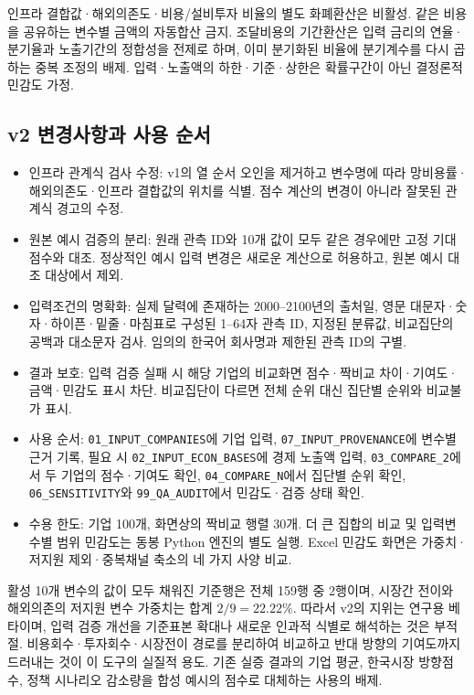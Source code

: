 인프라 결합값·해외의존도·비용/설비투자 비율의 별도 화폐환산은 비활성. 같은 비용을 공유하는 변수별 금액의 자동합산 금지. 조달비용의 기간환산은 입력 금리의 연율·분기율과 노출기간의 정합성을 전제로 하며, 이미 분기화된 비율에 분기계수를 다시 곱하는 중복 조정의 배제. 입력·노출액의 하한·기준·상한은 확률구간이 아닌 결정론적 민감도 가정.

\subsection*{v2 변경사항과 사용 순서}
\begin{itemize}[leftmargin=1.8em,itemsep=0.3em]
\item 인프라 관계식 검사 수정: v1의 열 순서 오인을 제거하고 변수명에 따라 망비용률·해외의존도·인프라 결합값의 위치를 식별. 점수 계산의 변경이 아니라 잘못된 관계식 경고의 수정.
\item 원본 예시 검증의 분리: 원래 관측 ID와 10개 값이 모두 같은 경우에만 고정 기대점수와 대조. 정상적인 예시 입력 변경은 새로운 계산으로 허용하고, 원본 예시 대조 대상에서 제외.
\item 입력조건의 명확화: 실제 달력에 존재하는 2000--2100년의 출처일, 영문 대문자·숫자·하이픈·밑줄·마침표로 구성된 1--64자 관측 ID, 지정된 분류값, 비교집단의 공백과 대소문자 검사. 임의의 한국어 회사명과 제한된 관측 ID의 구별.
\item 결과 보호: 입력 검증 실패 시 해당 기업의 비교화면 점수·짝비교 차이·기여도·금액·민감도 표시 차단. 비교집단이 다르면 전체 순위 대신 집단별 순위와 비교불가 표시.
\item 사용 순서: \nolinkurl{01_INPUT_COMPANIES}에 기업 입력, \nolinkurl{07_INPUT_PROVENANCE}에 변수별 근거 기록, 필요 시 \nolinkurl{02_INPUT_ECON_BASES}에 경제 노출액 입력, \nolinkurl{03_COMPARE_2}에서 두 기업의 점수·기여도 확인, \nolinkurl{04_COMPARE_N}에서 집단별 순위 확인, \nolinkurl{06_SENSITIVITY}와 \nolinkurl{99_QA_AUDIT}에서 민감도·검증 상태 확인.
\item 수용 한도: 기업 100개, 화면상의 짝비교 행렬 30개. 더 큰 집합의 비교 및 입력변수별 범위 민감도는 동봉 Python 엔진의 별도 실행. Excel 민감도 화면은 가중치·저지원 제외·중복채널 축소의 네 가지 사양 비교.
\end{itemize}

활성 10개 변수의 값이 모두 채워진 기준행은 전체 159행 중 2행이며, 시장간 전이와 해외의존의 저지원 변수 가중치는 합계 \(2/9=22.22\%\). 따라서 v2의 지위는 연구용 베타이며, 입력 검증 개선을 기준표본 확대나 새로운 인과적 식별로 해석하는 것은 부적절. 비용회수·투자회수·시장전이 경로를 분리하여 비교하고 반대 방향의 기여도까지 드러내는 것이 이 도구의 실질적 용도. 기존 실증 결과의 기업 평균, 한국시장 방향점수, 정책 시나리오 감소량을 합성 예시의 점수로 대체하는 사용의 배제.
